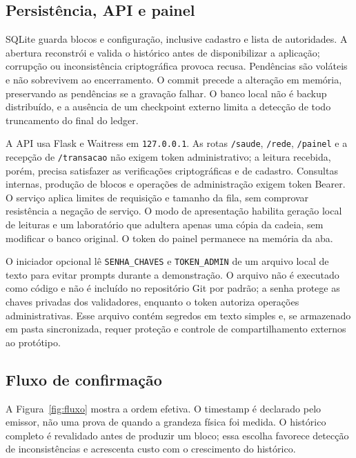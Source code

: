 \documentclass[10pt,a4paper,twocolumn]{article}
\begin{document}
\subsection{Persistência, API e painel}
SQLite guarda blocos e configuração, inclusive cadastro e lista de autoridades. A abertura reconstrói e valida o histórico antes de disponibilizar a aplicação; corrupção ou inconsistência criptográfica provoca recusa. Pendências são voláteis e não sobrevivem ao encerramento. O commit precede a alteração em memória, preservando as pendências se a gravação falhar. O banco local não é backup distribuído, e a ausência de um checkpoint externo limita a detecção de todo truncamento do final do ledger.

A API usa Flask e Waitress em \texttt{127.0.0.1}. As rotas \texttt{/saude}, \texttt{/rede}, \texttt{/painel} e a recepção de \texttt{/transacao} não exigem token administrativo; a leitura recebida, porém, precisa satisfazer as verificações criptográficas e de cadastro. Consultas internas, produção de blocos e operações de administração exigem token Bearer. O serviço aplica limites de requisição e tamanho da fila, sem comprovar resistência a negação de serviço. O modo de apresentação habilita geração local de leituras e um laboratório que adultera apenas uma cópia da cadeia, sem modificar o banco original. O token do painel permanece na memória da aba.

O iniciador opcional lê \texttt{SENHA\_CHAVES} e \texttt{TOKEN\_ADMIN} de um arquivo local de texto para evitar prompts durante a demonstração. O arquivo não é executado como código e não é incluído no repositório Git por padrão; a senha protege as chaves privadas dos validadores, enquanto o token autoriza operações administrativas. Esse arquivo contém segredos em texto simples e, se armazenado em pasta sincronizada, requer proteção e controle de compartilhamento externos ao protótipo.

\subsection{Fluxo de confirmação}
A Figura~\ref{fig:fluxo} mostra a ordem efetiva. O timestamp é declarado pelo emissor, não uma prova de quando a grandeza física foi medida. O histórico completo é revalidado antes de produzir um bloco; essa escolha favorece detecção de inconsistências e acrescenta custo com o crescimento do histórico.
\end{document}
